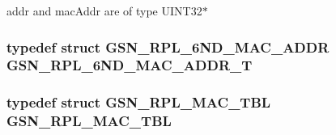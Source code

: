addr and macAddr are of type UINT32$\ast$ \hypertarget{a00473_a6497e887e46b1689bb6fb78c1cb3da52}{
\subsubsection[{GSN\_\-RPL\_\-6ND\_\-MAC\_\-ADDR\_\-T}]{\setlength{\rightskip}{0pt plus 5cm}typedef struct {\bf GSN\_\-RPL\_\-6ND\_\-MAC\_\-ADDR} {\bf GSN\_\-RPL\_\-6ND\_\-MAC\_\-ADDR\_\-T}}}
\label{a00473_a6497e887e46b1689bb6fb78c1cb3da52}
\hypertarget{a00473_a6b20f666b7a568c4fdcace0a0020b246}{
\subsubsection[{GSN\_\-RPL\_\-MAC\_\-TBL}]{\setlength{\rightskip}{0pt plus 5cm}typedef struct {\bf GSN\_\-RPL\_\-MAC\_\-TBL} {\bf GSN\_\-RPL\_\-MAC\_\-TBL}}}
\label{a00473_a6b20f666b7a568c4fdcace0a0020b246}



